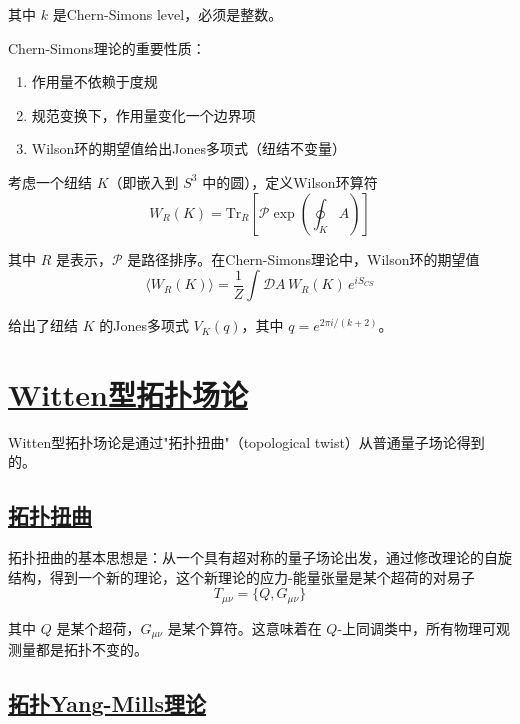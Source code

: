 其中 $k$ 是Chern-Simons level，必须是整数。

Chern-Simons理论的重要性质：
\begin{enumerate}
    \item 作用量不依赖于度规
    \item 规范变换下，作用量变化一个边界项
    \item Wilson环的期望值给出Jones多项式（纽结不变量）
\end{enumerate}

\begin{example}[Wilson环与Jones多项式]
    考虑一个纽结 $K$（即嵌入到 $S^3$ 中的圆），定义Wilson环算符
    \begin{equation*}
        W_R(K) = \text{Tr}_R \left[\mathcal{P} \exp\left(\oint_K A\right)\right]
    \end{equation*}

    其中 $R$ 是表示，$\mathcal{P}$ 是路径排序。在Chern-Simons理论中，Wilson环的期望值
    \begin{equation*}
        \langle W_R(K) \rangle = \frac{1}{Z} \int \mathcal{D}A \, W_R(K) \, e^{iS_{CS}}
    \end{equation*}

    给出了纽结 $K$ 的Jones多项式 $V_K(q)$，其中 $q = e^{2\pi i/(k+2)}$。
\end{example}

\section{\protect\hyperlink{:}{Witten型拓扑场论}}

Witten型拓扑场论是通过"拓扑扭曲"（topological twist）从普通量子场论得到的。

\subsection{\protect\hyperlink{:}{拓扑扭曲}}

拓扑扭曲的基本思想是：从一个具有超对称的量子场论出发，通过修改理论的自旋结构，得到一个新的理论，这个新理论的应力-能量张量是某个超荷的对易子
\begin{equation}
    T_{\mu\nu} = \{Q, G_{\mu\nu}\}
\end{equation}

其中 $Q$ 是某个超荷，$G_{\mu\nu}$ 是某个算符。这意味着在 $Q$-上同调类中，所有物理可观测量都是拓扑不变的。

\subsection{\protect\hyperlink{:}{拓扑Yang-Mills理论}}

